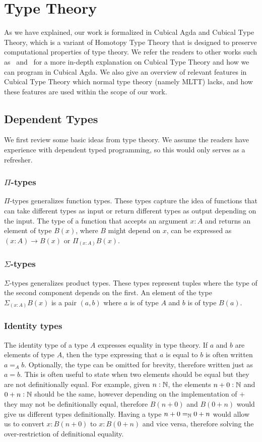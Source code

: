 \section{Type Theory}\label{sec:type-theory}
As we have explained, our work is formalized in Cubical Agda and Cubical Type Theory,
which is a variant of Homotopy Type Theory that is designed to preserve
computational properties of type theory.
We refer the readers to other works such as~\cite{vezzosiCubicalAgdaDependently2019}
and~\cite{cohenCubicalTypeTheory2018} for a more in-depth explanation on Cubical Type Theory
and how we can program in Cubical Agda.
We also give an overview of relevant features
in Cubical Type Theory which normal type theory (namely MLTT) lacks, and how these features
are used within the scope of our work.
\subsection{Dependent Types}
We first review some basic ideas from type theory. We assume the readers
have experience with dependent typed programming, so this would only
serves as a refresher.
\subsubsection{$\Pi$-types}
$\Pi$-types generalizes function types.
These types capture the idea of functions that can take different types
as input or return different types as output depending on the input.
The type of a function that accepts an argument $x: A$ and returns
an element of type $B(x)$, where $B$ might depend on $x$,
can be expressed as $(x: A) \to B(x)$ or $\Pi_{(x: A)} B(x)$.

\subsubsection{$\Sigma$-types}
$\Sigma$-types generalizes product types. 
These types represent tuples where the type of the second component
depends on the first. An element of the type
$\Sigma_{(x: A)} B(x)$ is a pair $(a, b)$
where $a$ is of type $A$ and $b$ is of type $B(a)$.

\subsubsection{Identity types}
The identity type of a type $A$ expresses equality in type theory.
If $a$ and $b$ are elements of type $A$, then the type expressing that
$a$ is equal to $b$ is often written $a =_A b$. Optionally, the type can
be omitted for brevity, therefore written just as $a = b$. This is
often useful to state when two elements should be equal but they are not
definitionally equal. For example, given $n : \mathbb{N}$, the elements
$n + 0 : \mathbb{N}$ and $0 + n : \mathbb{N}$ should be the same, however depending
on the implementation of $+$ they may not be definitionally equal,
therefore $B(n + 0)$ and $B(0 + n)$ would give us different types
definitionally. Having a type $n + 0 =_{\mathbb{N}} 0 + n$ would allow us to
convert $x : B(n + 0)$ to $x : B(0 + n)$ and vice versa, therefore
solving the over-restriction of definitional equality.

